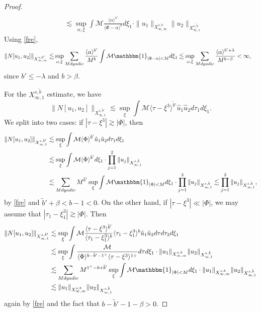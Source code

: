 \documentclass[%
11pt,  reqno]{amsart}
\newcommand{\jap}[1]{\langle #1 \rangle}
\newcommand{\5}{\textup{V}}
\theoremstyle{remark}
\numberwithin{equation}{section}
\numberwithin{theorem}{section}
\begin{document}
{\begin{proof}
\begin{align}
                \\& \lesssim \sup_{\alpha,\xi} \int \mathcal{M}\frac{\jap{\alpha}^{b'}}{\jap{\Phi-\alpha}^b  } d\xi_1 \cdot  \|u_1\|_{X^{s,b}_{\infty,\infty}}\|u_2\|_{X^{s,\tilde{b}}_{\infty,1}}
			\end{align}
Using \eqref{fre},
			\begin{align}
				\|N[u_1,u_2] \|_{X^{s,b'}_{\infty, \infty}}\lesssim &\sup_{\alpha,\xi}\sum_{M dyadic} \frac{\jap{\alpha}^{b'}}{M^{b}}\int \mathcal{M}\mathbbm{1}_{|\Phi-\alpha|<M} d\xi_1 \lesssim \sup_{\alpha,\xi}\sum_{M dyadic} \frac{\jap{\alpha}^{b'+\lambda}}{M^{b-\beta}} <\infty,
			\end{align}
			since $b'\le -\lambda$ and $b>\beta$.
            
            For the $X^{s,\tilde{b}}_{\infty, 1}$ estimate, we have
			\begin{equation}
				\|N[u_1,u_2]\|_{X^{s,\tilde{b}'}_{\infty,1}} \lesssim \sup_\xi \int \mathcal{M} \jap{\tau-\xi^3}^{\tilde{b}'}  \hat{u}_1 \hat{u}_2 d\tau_1 d\xi_1.
			\end{equation}
			We split into two cases: if $|\tau-\xi^3|\gtrsim |\Phi|$, then
			\begin{align}
				\|N[u_1,u_2]\|_{X^{s,\tilde{b}'}_{\infty,1}} &\lesssim \sup_\xi \int \mathcal{M} \jap{\Phi}^{\tilde{b}'} \hat{u}_1\hat{u}_2 d\tau_1 d\xi_1 \\&\lesssim \sup_\xi \int \mathcal{M} \jap{\Phi}^{\tilde{b}'} d\xi_1 \cdot  \prod_{j=1}^2\|u_j\|_{X^{s,\tilde{b}}_{\infty,1}} \\&\lesssim \sum_{M dyadic} M^{\tilde{b}'} \sup_\xi \int \mathcal{M} \mathbbm{1}_{|\Phi|<M} d\xi_1 \cdot \prod_{j=1}^2\|u_j\|_{X^{s,\tilde{b}}_{\infty,1}}  \lesssim \prod_{j=1}^2\|u_j\|_{X^{s,\tilde{b}}_{\infty,1}} ,
			\end{align}
			by \eqref{fre} and $\tilde{b}'+\beta<b-1<0$. On the other hand, if $|\tau-\xi^3|\ll |\Phi|$, we may assume that $|\tau_1-\xi_1^3|\gtrsim |\Phi|$. Then
			\begin{align}
				\|N[u_1,u_2]\|_{X^{s,\tilde{b}'}_{\infty,1}} &\lesssim \sup_\xi \int \mathcal{M} \frac{\jap{\tau-\xi^3}^{\tilde{b}'}}{\jap{\tau_1-\xi_1^3}^b} \jap{\tau_1-\xi_1^3}^b\hat{u}_1  \hat{u}_2 d\tau d\tau_2 d\xi_1 \\&\lesssim \sup_\xi \int \frac{\mathcal{M}}{\jap{\Phi}^{b-\tilde{b}'-1^+}\jap{\tau-\xi^3}^{1+} } d\tau d\xi_1 \cdot \|u_1\|_{X^{s,b}_{\infty,\infty}} \|u_2\|_{X^{s,\tilde{b}}_{\infty,1}} \\&\lesssim \sum_{M dyadic} M^{1^+-b+\tilde{b}'} \sup_\xi \int \mathcal{M} \mathbbm{1}_{|\Phi|<M} d\xi_1\cdot \|u_1\|_{X^{s,b}_{\infty,\infty}}  \|u_2\|_{X^{s,\tilde{b}}_{\infty,1}}\\& \lesssim\|u_1\|_{X^{s,b}_{\infty,\infty}}  \|u_2\|_{X^{s,\tilde{b}}_{\infty,1}}
			\end{align}
			again by \eqref{fre} and the fact that $b-\tilde{b}'-1-\beta>0$.
		\end{proof}
		
}
\end{document}
